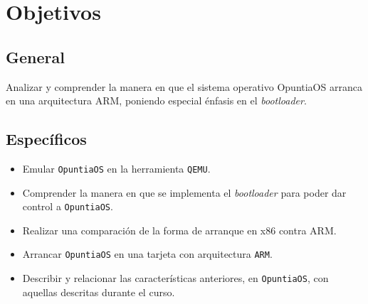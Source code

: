 \section{Objetivos}



\subsection{General}
Analizar y comprender la manera en que el sistema operativo OpuntiaOS arranca en 
una arquitectura ARM, poniendo especial énfasis en el \textit{bootloader}.



\subsection{Específicos}
\begin{itemize} \setlength\itemsep{0pt}
	\item Emular \texttt{OpuntiaOS} en la herramienta \texttt{QEMU}.
	\item Comprender la manera en que se implementa el \textit{bootloader} 
	para poder dar control a \texttt{OpuntiaOS}.
	\item Realizar una comparación de la forma  de arranque en x86 contra ARM.
	\item Arrancar \texttt{OpuntiaOS} en una tarjeta con arquitectura \texttt{ARM}.
	\item Describir y relacionar las características anteriores, en \texttt{OpuntiaOS}, con aquellas descritas
	durante el curso.
\end{itemize}


